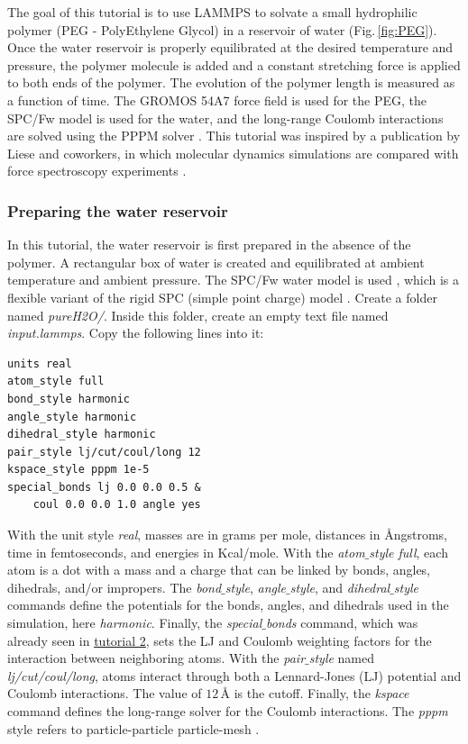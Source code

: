 \documentclass[9pt,tutorial]{livecoms}
\begin{document}
\noindent The goal of this tutorial is to use LAMMPS to solvate a small hydrophilic polymer (PEG - PolyEthylene Glycol) in a reservoir of water (Fig.\,\ref{fig:PEG}). Once the water reservoir is properly equilibrated at the desired temperature and pressure, the polymer molecule is added and a constant stretching force is applied to both ends of the polymer. The evolution of the polymer length is measured as a function of time. The GROMOS 54A7 force field \cite{schmid2011definition} is used for the PEG, the SPC/Fw model \cite{wu2006flexible} is used for the water, and the long-range Coulomb interactions are solved using the PPPM solver \cite{luty1996calculating}. This tutorial was inspired by a publication by Liese and coworkers, in which molecular dynamics simulations are compared with force spectroscopy experiments \cite{liese2017hydration}.

\subsubsection{Preparing the water reservoir}

In this tutorial, the water reservoir is first prepared in the absence of the polymer. A rectangular box of water is created and equilibrated at ambient temperature and ambient pressure. The SPC/Fw water model is used \cite{wu2006flexible}, which is
a flexible variant of the rigid SPC (simple point charge) model \cite{berendsen1981interaction}. Create a folder named \textit{pureH2O/}. Inside this folder, create an empty text file named \textit{input.lammps}. Copy the following lines into it:
{\normalsize \begin{verbatim}
units real
atom_style full
bond_style harmonic
angle_style harmonic
dihedral_style harmonic
pair_style lj/cut/coul/long 12
kspace_style pppm 1e-5
special_bonds lj 0.0 0.0 0.5 &
    coul 0.0 0.0 1.0 angle yes
\end{verbatim}}
With the unit style \textit{real}, masses are in grams per mole, distances in Ångstroms, time in femtoseconds, and energies
in Kcal/mole. With the \textit{atom$\_$style full}, each atom is a dot with a mass and a charge that can be linked by bonds, angles, dihedrals, and/or impropers. The \textit{bond$\_$style}, \textit{angle$\_$style}, and \textit{dihedral$\_$style} commands define the potentials for the bonds, angles, and dihedrals used in the simulation, here \textit{harmonic}. Finally, the \textit{special$\_$bonds} command, which was already seen in \hyperref[carbon-nanotube-label]{tutorial 2}, sets the LJ and Coulomb weighting factors for the interaction between neighboring atoms. With the \textit{pair$\_$style} named \textit{lj/cut/coul/long}, atoms interact through both a Lennard-Jones (LJ) potential and Coulomb interactions. The value of $12\,\text{Å}$ is the cutoff. Finally, the \textit{kspace} command defines the long-range solver for the Coulomb interactions. The \textit{pppm} style refers to particle-particle particle-mesh \cite{luty1996calculating}.
\end{document}
